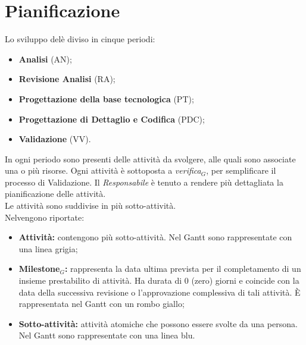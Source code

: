 \chapter{Pianificazione}\label{Pianificazione}
\begin{flushleft}
Lo sviluppo delè diviso in cinque periodi:
\begin{itemize}
    \item \textbf{Analisi} (AN);
    \item \textbf{Revisione Analisi} (RA);
    \item \textbf{Progettazione della base tecnologica} (PT);
    \item \textbf{Progettazione di Dettaglio e Codifica} (PDC);
    \item \textbf{Validazione} (VV).
\end{itemize}
In ogni periodo sono presenti delle attività da svolgere, alle quali sono associate una o più risorse. Ogni attività è sottoposta a \textit{verifica$_{G}$}, per semplificare il processo di Validazione. Il \textit{Responsabile} è tenuto a rendere più dettagliata la pianificazione delle attività.\\
Le attività sono suddivise in più sotto-attività.\\
Nelvengono riportate:
\begin{itemize}
    \item \textbf{Attività:} contengono più sotto-attività. Nel Gantt sono rappresentate con una linea grigia;
    \item \textbf{Milestone$_{G}$:} rappresenta la data ultima prevista per il completamento di un insieme prestabilito di attività. Ha durata di 0 (zero) giorni e coincide con la data della successiva revisione o l'approvazione complessiva di tali attività. È rappresentata nel Gantt con un rombo giallo;
    \item \textbf{Sotto-attività:} attività atomiche che possono essere svolte da una persona. Nel Gantt sono rappresentate con una linea blu.  
\end{itemize}

\end{flushleft}
